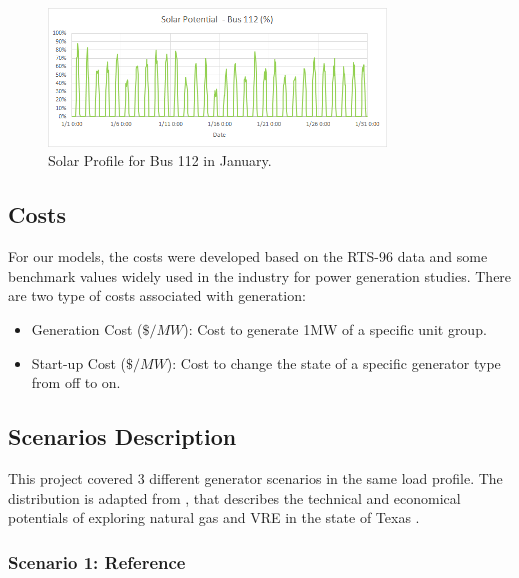 \documentclass[12pt,LUDisStyle,twosided]{book}
\begin{document}
\newpage
\begin{figure}[H] 
	\begin{center}
		\includegraphics[width=0.8\textwidth,keepaspectratio]{solarPotentialBus112.png}
	  	\caption{Solar Profile for Bus 112 in January.}
     	\label{fig:solarProfileBus112January}
	\end{center}
\end{figure}


\subsection{Costs}

For our models, the costs were developed based on the RTS-96 data and some benchmark values widely used in the industry for power generation studies. There are two type of costs associated with generation:

\begin{itemize}
\item Generation Cost ($\$/MW$): Cost to generate 1MW of a specific unit group.
\item Start-up Cost ($\$/MW$): Cost to change the state of a specific generator type from off to on.
\end{itemize}

\subsection{Scenarios Description} \label{section:ScenarioDesc}

This project covered 3 different generator scenarios in the same load profile. The distribution is adapted from \citeauthor{shavel} \cite{shavel}, that describes the technical and economical potentials of exploring natural gas and VRE in the state of Texas \cite{shavel}. 

\subsubsection{Scenario 1: Reference}
\end{document}
